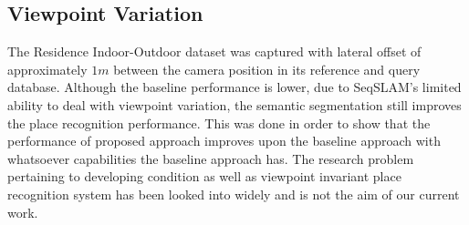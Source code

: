 \documentclass[letterpaper, 10 pt, conference]{ieeeconf}  %
\begin{document}
\subsection{Viewpoint Variation}
The Residence Indoor-Outdoor dataset was captured with lateral offset of approximately $1 m$ between the camera position in its reference and query database. Although the baseline performance is lower, due to SeqSLAM's limited ability to deal with viewpoint variation, the semantic segmentation still improves the place recognition performance. This was done in order to show that the performance of proposed approach improves upon the baseline approach with whatsoever capabilities the baseline approach has. The research problem pertaining to developing condition as well as viewpoint invariant place recognition system has been looked into widely \cite{milford2015sequence,chen2017deep} and is not the aim of our current work.
\end{document}

